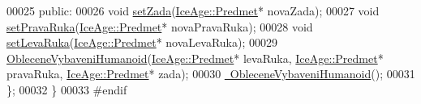 \begin{DoxyCode}
00025     \textcolor{keyword}{public}:
00026         \textcolor{keywordtype}{void} \hyperlink{classIceAge_1_1ObleceneVybaveniHumanoid_ae81463b9f6e6bd01a8c367883b50e450}{setZada}(\hyperlink{classIceAge_1_1Predmet}{IceAge::Predmet}* novaZada);
00027         \textcolor{keywordtype}{void} \hyperlink{classIceAge_1_1ObleceneVybaveniHumanoid_a2e6b26315e6bab11d63e3386c8eb3242}{setPravaRuka}(\hyperlink{classIceAge_1_1Predmet}{IceAge::Predmet}* novaPravaRuka);
00028         \textcolor{keywordtype}{void} \hyperlink{classIceAge_1_1ObleceneVybaveniHumanoid_a3f7f628310db32976843e34a32300bea}{setLevaRuka}(\hyperlink{classIceAge_1_1Predmet}{IceAge::Predmet}* novaLevaRuka);
00029         \hyperlink{classIceAge_1_1ObleceneVybaveniHumanoid_aba55421b187ea1b6f4b6100208868c04}{ObleceneVybaveniHumanoid}(\hyperlink{classIceAge_1_1Predmet}{IceAge::Predmet}* levaRuka, 
      \hyperlink{classIceAge_1_1Predmet}{IceAge::Predmet}* pravaRuka, \hyperlink{classIceAge_1_1Predmet}{IceAge::Predmet}* zada);
00030         \hyperlink{classIceAge_1_1ObleceneVybaveniHumanoid_ab018a5ab8e4c1570420db1ac2f3e6eaf}{~ObleceneVybaveniHumanoid}();
00031     \};
00032 \}
00033 \textcolor{preprocessor}{#endif}
\end{DoxyCode}
